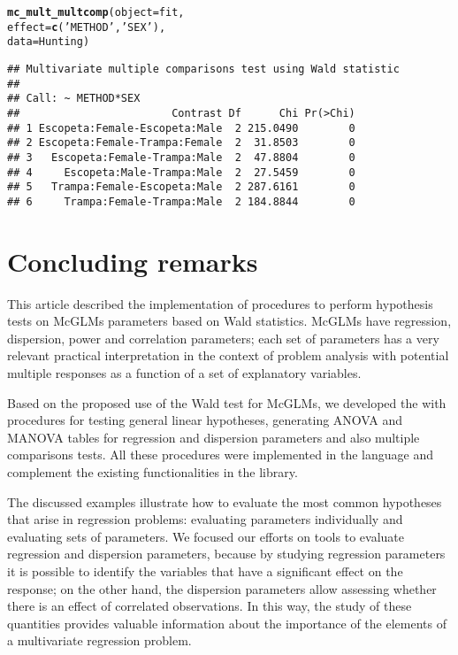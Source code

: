 \documentclass[article]{jss}\usepackage[]{graphicx}\usepackage[]{xcolor}
\makeatletter
\newcommand{\hlstr}[1]{\textcolor[rgb]{0.192,0.494,0.8}{#1}}%
\newcommand{\hlstd}[1]{\textcolor[rgb]{0.345,0.345,0.345}{#1}}%
\newcommand{\hlkwc}[1]{\textcolor[rgb]{0.333,0.667,0.333}{#1}}%
\newcommand{\hlkwd}[1]{\textcolor[rgb]{0.737,0.353,0.396}{\textbf{#1}}}%
\newenvironment{kframe}{%
 \def\at@end@of@kframe{}%
 \ifinner\ifhmode%
  \def\at@end@of@kframe{\end{minipage}}%
  \begin{minipage}{\columnwidth}%
 \fi\fi%
 \def\FrameCommand##1{\hskip\@totalleftmargin \hskip-\fboxsep
 \colorbox{shadecolor}{##1}\hskip-\fboxsep
     \hskip-\linewidth \hskip-\@totalleftmargin \hskip\columnwidth}%
 \MakeFramed {\advance\hsize-\width
   \@totalleftmargin\z@ \linewidth\hsize
   \@setminipage}}%
 {\par\unskip\endMakeFramed%
 \at@end@of@kframe}
\newenvironment{knitrout}{}{} %
\makeatother
\begin{document}
\begin{knitrout}
\color{fgcolor}\begin{kframe}
\begin{alltt}
\hlkwd{mc_mult_multcomp}\hlstd{(}\hlkwc{object} \hlstd{= fit,}
                 \hlkwc{effect} \hlstd{=} \hlkwd{c}\hlstd{(}\hlstr{'METHOD'}\hlstd{,} \hlstr{'SEX'}\hlstd{),}
                 \hlkwc{data} \hlstd{= Hunting)}
\end{alltt}
\begin{verbatim}
## Multivariate multiple comparisons test using Wald statistic
## 
## Call: ~ METHOD*SEX
##                        Contrast Df      Chi Pr(>Chi)
## 1 Escopeta:Female-Escopeta:Male  2 215.0490        0
## 2 Escopeta:Female-Trampa:Female  2  31.8503        0
## 3   Escopeta:Female-Trampa:Male  2  47.8804        0
## 4     Escopeta:Male-Trampa:Male  2  27.5459        0
## 5   Trampa:Female-Escopeta:Male  2 287.6161        0
## 6     Trampa:Female-Trampa:Male  2 184.8844        0
\end{verbatim}
\end{kframe}
\end{knitrout}


\section{Concluding remarks}\label{sec:conclusao}

This article described the  implementation of procedures to perform hypothesis tests on McGLMs parameters based on Wald statistics. McGLMs have regression, dispersion, power and correlation parameters; each set of parameters has a very relevant practical interpretation in the context of problem analysis with potential multiple responses as a function of a set of explanatory variables.

Based on the proposed use of the Wald test for McGLMs, we developed the  with procedures for testing general linear hypotheses, generating ANOVA and MANOVA tables for regression and dispersion parameters and also multiple comparisons tests. All these procedures were implemented in the  language and complement the existing functionalities in the  library.

The discussed examples illustrate how to evaluate the most common hypotheses that arise in regression problems: evaluating parameters individually and evaluating sets of parameters. We focused our efforts on tools to evaluate regression and dispersion parameters, because by studying regression parameters it is possible to identify the variables that have a significant effect on the response; on the other hand, the dispersion parameters allow assessing whether there is an effect of correlated observations. In this way, the study of these quantities provides valuable information about the importance of the elements of a multivariate regression problem.
\end{document}
